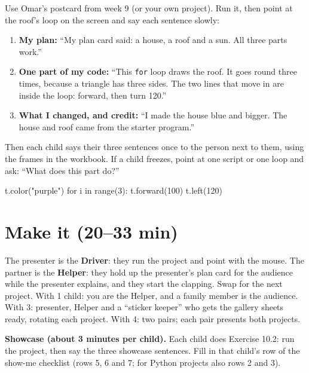 \begin{workedexample}
Use Omar's postcard from week 9 (or your own project). Run it, then point at the roof's loop on the screen and say each sentence slowly:
\begin{enumerate}[leftmargin=1.4em,itemsep=1pt]
  \item \textbf{My plan:} \enquote{My plan card said: a house, a roof and a sun. All three parts work.}
  \item \textbf{One part of my code:} \enquote{This \texttt{for} loop draws the roof. It goes round three times, because a triangle has three sides. The two lines that move in are inside the loop: forward, then turn 120.}
  \item \textbf{What I changed, and credit:} \enquote{I made the house blue and bigger. The house and roof came from the starter program.}
\end{enumerate}
Then each child says their three sentences once to the person next to them, using the frames in the workbook. If a child freezes, point at one script or one loop and ask: \enquote{What does this part do?}
\end{workedexample}
\begin{pycode}
t.color("purple")
for i in range(3):
    t.forward(100)
    t.left(120)
\end{pycode}

\section{Make it (20--33 min)}
\begin{pairroles}
The presenter is the \textbf{Driver}: they run the project and point with the mouse. The partner is the \textbf{Helper}: they hold up the presenter's plan card for the audience while the presenter explains, and they start the clapping. Swap for the next project. With 1 child: you are the Helper, and a family member is the audience. With 3: presenter, Helper and a \enquote{sticker keeper} who gets the gallery sheets ready, rotating each project. With 4: two pairs; each pair presents both projects.
\end{pairroles}

\textbf{Showcase (about 3 minutes per child).} Each child does Exercise 10.2: run the project, then say the three showcase sentences. Fill in that child's row of the show-me checklist (rows 5, 6 and 7; for Python projects also rows 2 and 3).

